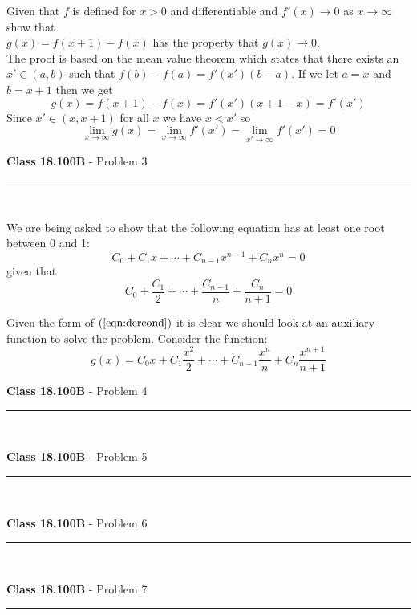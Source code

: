 \documentclass[11pt,reqno]{article}
\begin{document}
Given that $f$ is defined for $x > 0$ and differentiable and $f'(x) \to 0$ as $x \to \infty$ show that \\
$g(x) = f(x+1) - f(x)$ has the property that $g(x) \to 0$.  \\
\indent The proof is based on the mean value theorem which states that there exists an $x' \in (a,b)$ such that $f(b)-f(a) = f'(x')(b-a)$. If we let $a = x$ and $b = x+1$ then we get 
\[ g(x) = f(x+1) - f(x) = f'(x')(x+1 - x) = f'(x') \]
Since $x' \in (x,x+1)$ for all $x$ we have $x < x'$ so 
\[ \lim_{x \to \infty} g(x) = \lim_{x \to \infty} f'(x')  =   \lim_{x' \to \infty} f'(x') = 0\]

\newpage
\vspace{15pt}
\begin{flushleft} 
\textbf{Class 18.100B} - Problem 3\\
\rule{500pt}{1pt}\\
\end{flushleft} 

We are being asked to show that the following equation has at least one root between 0 and 1:
\[ C_0 + C_1 x + \cdots + C_{n-1} x^{n-1} + C_n x^n = 0 \] 
 given that 
 \begin{equation} 
 C_0 + \frac{C_1}{2} + \cdots +\frac{C_{n-1}}{n} + \frac{C_n}{n+1}  = 0 \label{eqn:dercond}
 \end{equation}
 
 \indent Given the form of $(\ref{eqn:dercond})$ it is clear we should look at an auxiliary function to solve the problem. Consider the function:
 \[ g(x) = C_0 x + C_1 \frac{x^2}{2} + \cdots + C_{n-1} \frac{x^n}{n} + C_n \frac{x^{n+1}}{n+1} \]
 
\vspace{15pt}
\begin{flushleft} 
\textbf{Class 18.100B} - Problem 4\\
\rule{500pt}{1pt}\\
\end{flushleft} 


\vspace{15pt}
\begin{flushleft} 
\textbf{Class 18.100B} - Problem 5\\
\rule{500pt}{1pt}\\
\end{flushleft} 


\vspace{15pt}
\begin{flushleft} 
\textbf{Class 18.100B} - Problem 6\\
\rule{500pt}{1pt}\\
\end{flushleft} 


\vspace{15pt}
\begin{flushleft} 
\textbf{Class 18.100B} - Problem 7\\
\rule{500pt}{1pt}\\
\end{flushleft} 


\end{document}
